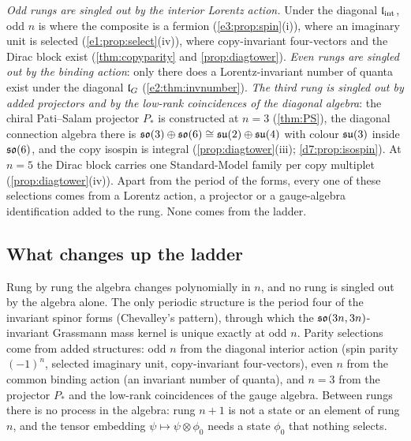 \emph{Odd rungs are singled out by the interior Lorentz action.} Under the diagonal $\mathfrak l_{\rm int}$, odd $n$ is where the composite is a fermion
(\cref{e3:prop:spin}(i)), where an imaginary unit is selected (\cref{e1:prop:select}(iv)), where copy-invariant four-vectors and the Dirac block
exist (\cref{thm:copyparity} and \cref{prop:diagtower}). \emph{Even rungs
are singled out by the binding action}: only there does a Lorentz-invariant number of quanta exist under the diagonal $\mathfrak l_G$
(\cref{e2:thm:invnumber}). \emph{The third rung is singled out by added projectors and by the low-rank coincidences of the diagonal algebra}: the
chiral Pati--Salam projector $P_*$ is constructed at $n=3$ (\cref{thm:PS}), the diagonal connection algebra there is
$\mathfrak{so}(3)\oplus\mathfrak{so}(6)\cong\mathfrak{su}(2)\oplus\mathfrak{su}(4)$ with colour $\mathfrak{su}(3)$ inside $\mathfrak{so}(6)$, and the copy isospin is integral (\cref{prop:diagtower}(iii);
\cref{d7:prop:isospin}). At $n=5$ the Dirac block carries one Standard-Model family per copy multiplet (\cref{prop:diagtower}(iv)). Apart from the period of the forms, every one of these selections comes from a Lorentz action, a projector or a gauge-algebra
identification added to the rung. None comes from the ladder.

\subsection{What changes up the ladder}

Rung by rung the algebra changes polynomially in $n$, and no rung is singled out by the algebra alone. The only periodic structure is the
period four of the invariant spinor forms (Chevalley's pattern), through which the $\mathfrak{so}(3n,3n)$-invariant Grassmann mass kernel is unique
exactly at odd $n$. Parity selections come from added structures: odd $n$ from the diagonal interior action (spin parity $(-1)^n$, selected
imaginary unit, copy-invariant four-vectors), even $n$ from the common binding action (an invariant number of quanta), and $n=3$ from the
projector $P_*$ and the low-rank coincidences of the gauge algebra. Between rungs there is no process in the algebra: rung $n+1$ is not a
state or an element of rung $n$, and the tensor embedding $\psi\mapsto\psi\otimes\phi_0$ needs a state $\phi_0$ that nothing selects.

